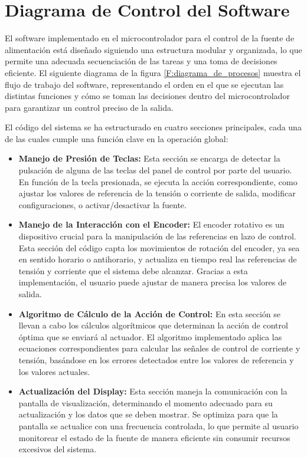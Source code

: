 \section{Diagrama de Control del Software}
El software implementado en el microcontrolador para el control de la fuente de alimentación está diseñado siguiendo una estructura modular y organizada, lo que permite una adecuada secuenciación de las tareas y una toma de decisiones eficiente. El siguiente diagrama de la figura \ref{F:diagrama_de_procesos} muestra el flujo de trabajo del software, representando el orden en el que se ejecutan las distintas funciones y cómo se toman las decisiones dentro del microcontrolador para garantizar un control preciso de la salida.\par
El código del sistema se ha estructurado en cuatro secciones principales, cada una de las cuales cumple una función clave en la operación global:\par
\begin{itemize}
    \item \textbf{Manejo de Presión de Teclas:} Esta sección se encarga de detectar la pulsación de alguna de las teclas del panel de control por parte del usuario. En función de la tecla presionada, se ejecuta la acción correspondiente, como ajustar los valores de referencia de la tensión o corriente de salida, modificar configuraciones, o activar/desactivar la fuente.
    \item \textbf{Manejo de la Interacción con el Encoder:} El encoder rotativo es un dispositivo crucial para la manipulación de las referencias en lazo de control. Esta sección del código capta los movimientos de rotación del encoder, ya sea en sentido horario o antihorario, y actualiza en tiempo real las referencias de tensión y corriente que el sistema debe alcanzar. Gracias a esta implementación, el usuario puede ajustar de manera precisa los valores de salida.
    \item \textbf{Algoritmo de Cálculo de la Acción de Control:} En esta sección se llevan a cabo los cálculos algorítmicos que determinan la acción de control óptima que se enviará al actuador. El algoritmo implementado aplica las ecuaciones correspondientes para calcular las señales de control de corriente y tensión, basándose en los errores detectados entre los valores de referencia y los valores actuales.
    \item \textbf{Actualización del Display:} Esta sección maneja la comunicación con la pantalla de visualización, determinando el momento adecuado para su actualización y los datos que se deben mostrar. Se optimiza para que la pantalla se actualice con una frecuencia controlada, lo que permite al usuario monitorear el estado de la fuente de manera eficiente sin consumir recursos excesivos del sistema.
\end{itemize}

